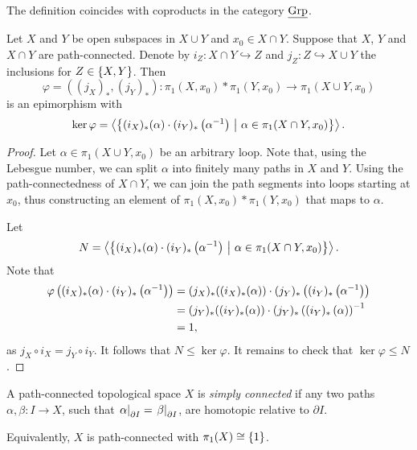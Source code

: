 \begin{opomba}
The definition coincides with coproducts in the category
$\underline{\operatorname{Grp}}$.
\end{opomba}

\begin{izrek}
Let $X$ and $Y$ be open subspaces in $X \cup Y$ and
$x_0 \in X \cap Y$. Suppose that $X$, $Y$ and $X \cap Y$ are
path-connected. Denote by $i_Z \colon X \cap Y \hookrightarrow Z$
and $j_Z \colon Z \hookrightarrow X \cup Y$ the inclusions for
$Z \in \left\{X, Y\right\}$. Then
\[
\varphi = ((j_X)_*, (j_Y)_*) \colon
\pi_1(X, x_0) * \pi_1(Y, x_0) \to \pi_1(X \cup Y, x_0)
\]
is an epimorphism with
\[
\ker \varphi =
\left\langle \left\{(i_X)_*(\alpha) \cdot (i_Y)_* \left(\alpha^{-1}\right)~\middle\vert~\alpha \in \pi_1(X \cap Y, x_0)\right\}\right\rangle.
\]
\end{izrek}

\begin{proof}
Let $\alpha \in \pi_1(X \cup Y, x_0)$ be an arbitrary loop. Note
that, using the Lebesgue number, we can split $\alpha$ into
finitely many paths in $X$ and $Y$. Using the path-connectedness of
$X \cap Y$, we can join the path segments into loops starting at
$x_0$, thus constructing an element of
$\pi_1(X, x_0) * \pi_1(Y, x_0)$ that maps to $\alpha$.

Let
\[
N = \left\langle \left\{(i_X)_*(\alpha) \cdot (i_Y)_*\left(\alpha^{-1}\right)~\middle\vert~\alpha \in \pi_1(X \cap Y, x_0)\right\}\right\rangle.
\]
Note that
\begin{align*}
\varphi \left((i_X)_*(\alpha) \cdot (i_Y)_*\left(\alpha^{-1}\right)\right) &=
(j_X)_*((i_X)_*(\alpha)) \cdot (j_Y)_* \left((i_Y)_*\left(\alpha^{-1}\right)\right)
\\
&=
(j_Y)_*((i_Y)_*(\alpha)) \cdot (j_Y)_* \left((i_Y)_*\left(\alpha\right)\right)^{-1}
\\
&=
1,
\end{align*}
as $j_X \circ i_X = j_Y \circ i_Y$. It follows that
$N \leq \ker \varphi$. It remains to check that
$\ker \varphi \leq N$.
\end{proof}

\begin{definicija}
A path-connected topological space $X$ is
\emph{simply connected} if any two paths
$\alpha, \beta \colon I \to X$, such that
$\left. \alpha\right|_{\partial I}^{} = \left. \beta\right|_{\partial I}^{}$, are
homotopic relative to $\partial I$.
\end{definicija}

\begin{opomba}
Equivalently, $X$ is path-connected with $\pi_1(X) \cong \left\{1\right\}$.
\end{opomba}
